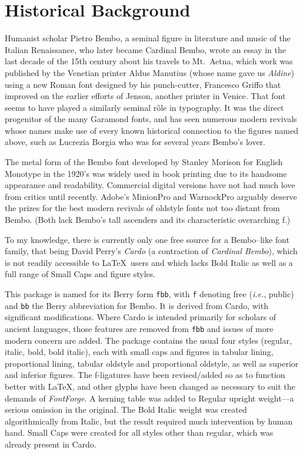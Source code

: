 \documentclass{article}
\begin{document}
\section{Historical Background}
Humanist scholar Pietro Bembo, a seminal figure in literature and music of the Italian Renaissance, who later became Cardinal Bembo, wrote an essay in the last decade of the 15th century about his travels to Mt.\ Aetna, which work was published by the Venetian printer Aldus Manutius (whose name gave us \emph{Aldine}) using a new Roman font designed by his punch-cutter, Francesco Griffo that improved on the earlier efforts of Jenson, another printer in Venice. That font seems to have played a similarly seminal r\^ole in  typography. It was the direct progenitor of the many Garamond fonts, and has seen numerous modern revivals whose names make use of every known historical connection to the figures named above, such as Lucrezia Borgia who was for several years Bembo's  lover.

The metal form of the Bembo font developed by Stanley Morison for English Monotype in the 1920's was widely used in book printing due to its handsome appearance and readability. Commercial digital versions have not had much love from critics until recently.  Adobe's MinionPro and WarnockPro arguably deserve the prizes for the best modern revivals of oldstyle fonts not too distant from Bembo. (Both lack Bembo's tall ascenders and its characteristic overarching f.)

To my knowledge, there is currently only one free source for a Bembo--like font family, that being David Perry's \emph{Cardo} (a contraction of \emph{Cardinal Bembo}), which is not readily accessible to 
\LaTeX\ users and which lacks Bold Italic as well as a full range of Small Caps and figure styles.

This package is named for its Berry form {\tt fbb}, with {\tt f} denoting free (\emph{i.e.}, public) and {\tt bb} the Berry abbreviation for Bembo. It is derived from Cardo, with significant  modifications. Where Cardo is intended primarily  for scholars of ancient languages, those features are removed from {\tt fbb} and issues of more modern concern are added. The package contains the usual four styles (regular, italic, bold, bold italic), each with small caps and figures in tabular lining, proportional lining, tabular oldstyle and proportional oldstyle, as well as superior and inferior figures. The f-ligatures have been  revised/added  so as to function better with \LaTeX, and other glyphs have been changed as necessary to suit the demands of \emph{FontForge}. A kerning table was added to Regular upright weight---a serious omission in the original.  The Bold Italic weight was created algorithmically from Italic, but the result required much intervention by human hand. Small Caps were created for all styles other than regular, which was already present in Cardo. 
\end{document}
